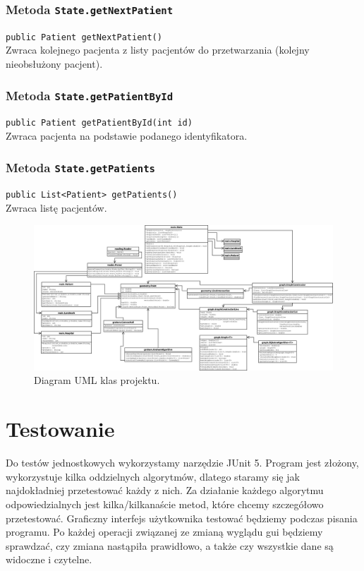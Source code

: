 \documentclass{article}
\begin{document}
\subsubsection{Metoda \texttt{State.getNextPatient}}
\texttt{public Patient getNextPatient()} \\
Zwraca kolejnego pacjenta z listy pacjentów do przetwarzania (kolejny nieobsłużony pacjent).

\subsubsection{Metoda \texttt{State.getPatientById}}
\texttt{public Patient getPatientById(int id)} \\
Zwraca pacjenta na podstawie podanego identyfikatora.

\subsubsection{Metoda \texttt{State.getPatients}}
\texttt{public List<Patient> getPatients()} \\
Zwraca listę pacjentów.

\begin{landscape}
\begin{figure}[h]
    \centering
    \includegraphics[scale=0.15]{images/UML.png}
    \caption{Diagram UML klas projektu.}
\end{figure}
\end{landscape}

\section{Testowanie}
Do testów jednostkowych wykorzystamy narzędzie JUnit 5.
Program jest złożony, wykorzystuje kilka oddzielnych algorytmów, dlatego staramy się jak najdokładniej przetestować każdy z nich. Za działanie każdego algorytmu odpowiedzialnych jest kilka/kilkanaście metod, które chcemy szczegółowo przetestować. Graficzny interfejs użytkownika testować będziemy podczas pisania programu. Po każdej operacji związanej ze zmianą wyglądu gui będziemy sprawdzać, czy zmiana nastąpiła prawidłowo, a także czy wszystkie dane są widoczne i czytelne.
\end{document}

